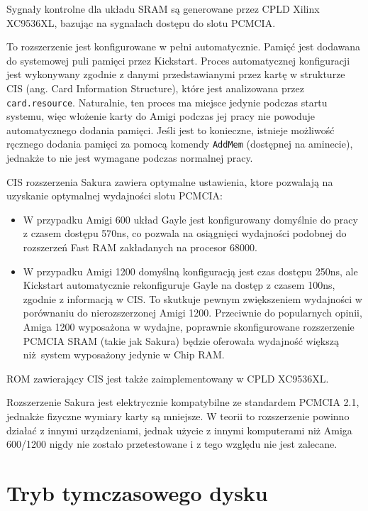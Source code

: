 \documentclass[10pt,a4paper]{article}
\begin{document}
Sygnały kontrolne dla układu SRAM są generowane przez CPLD Xilinx XC9536XL, bazując na sygnałach dostępu do slotu PCMCIA.

To rozszerzenie jest konfigurowane w pełni automatycznie. Pamięć jest dodawana do systemowej puli pamięci przez Kickstart. Proces automatycznej konfiguracji jest wykonywany zgodnie z danymi przedstawianymi przez kartę w strukturze CIS (ang. Card Information Structure), które jest analizowana przez {\tt card.resource}. Naturalnie, ten proces ma miejsce jedynie podczas startu systemu, więc włożenie karty do Amigi podczas jej pracy nie powoduje automatycznego dodania pamięci. Jeśli jest to konieczne, istnieje możliwość ręcznego dodania pamięci za pomocą komendy {\tt AddMem} (dostępnej na aminecie), jednakże to nie jest wymagane podczas normalnej pracy. 

CIS rozszerzenia Sakura zawiera optymalne ustawienia, ktore pozwalają na uzyskanie optymalnej wydajności slotu PCMCIA:
\begin{itemize}
	\item W przypadku Amigi 600 układ Gayle jest konfigurowany domyślnie do pracy z czasem dostępu 570ns, co pozwala na osiągnięci wydajności podobnej do rozszerzeń Fast RAM zakładanych na procesor 68000.
	\item W przypadku Amigi 1200 domyślną konfiguracją jest czas dostępu 250ns, ale Kickstart automatycznie rekonfiguruje Gayle na dostęp z czasem 100ns, zgodnie z informacją w CIS. To skutkuje pewnym zwiększeniem wydajności w porównaniu do nierozszerzonej Amigi 1200. Przeciwnie do popularnych opinii, Amiga 1200 wyposażona w wydajne, poprawnie skonfigurowane rozszerzenie PCMCIA SRAM (takie jak Sakura) będzie oferowała wydajność większą niż system wyposażony jedynie w Chip RAM.
\end{itemize}

ROM zawierający CIS jest także zaimplementowany w CPLD XC9536XL.

Rozszerzenie Sakura jest elektrycznie kompatybilne ze standardem PCMCIA 2.1, jednakże fizyczne wymiary karty są mniejsze. W teorii to rozszerzenie powinno działać z innymi urządzeniami, jednak użycie z innymi komputerami niż Amiga 600/1200 nigdy nie zostało przetestowane i z tego względu nie jest zalecane.

\section*{Tryb tymczasowego dysku}
\end{document}
